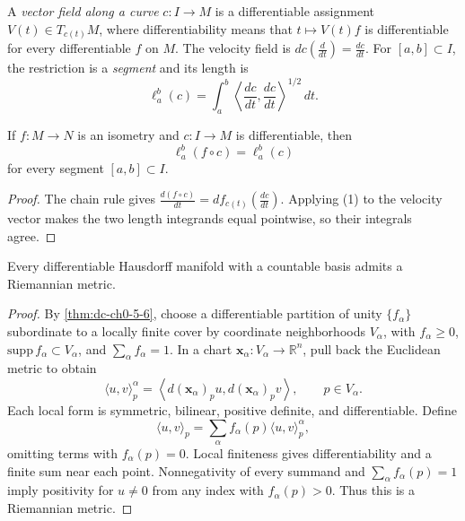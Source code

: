 \begin{definition}
  \label{def:dc-ch1-2-9}
  \leanok
  A \emph{vector field along a curve} $c:I\to M$ is a differentiable assignment
  $V(t)\in T_{c(t)}M$, where differentiability means that $t\mapsto V(t)f$ is
  differentiable for every differentiable $f$ on $M$. The velocity field is
  $dc(\frac{d}{dt})=\frac{dc}{dt}$. For $[a,b]\subset I$, the restriction is a
  \emph{segment} and its length is
  $$
  \ell_a^b(c)=\int_a^b\left\langle\frac{dc}{dt},\frac{dc}{dt}\right\rangle^{1/2}\,dt.
  $$
\end{definition}

\begin{lemma}
  \label{lem:dc-ch1-2-9-isom}
  \leanok
  If $f:M\to N$ is an isometry and $c:I\to M$ is differentiable, then
  $$
  \ell_a^b(f\circ c)=\ell_a^b(c)
  $$
  for every segment $[a,b]\subset I$.
\end{lemma}
\begin{proof}
  \leanok
  \sketch
  The chain rule gives $\frac{d(f\circ c)}{dt}=df_{c(t)}(\frac{dc}{dt})$. Applying
  (1) to the velocity vector makes the two length integrands equal pointwise, so
  their integrals agree.
\end{proof}

\begin{proposition}
  \label{prop:dc-ch1-2-10}
  \leanok
  Every differentiable Hausdorff manifold with a countable basis admits a
  Riemannian metric.
\end{proposition}
\begin{proof}
  \leanok
  \sketch
  By \cref{thm:dc-ch0-5-6}, choose a differentiable partition of unity
  $\{f_\alpha\}$ subordinate to a locally finite cover by coordinate neighborhoods
  $V_\alpha$, with $f_\alpha\ge0$, $\mathrm{supp}\,f_\alpha\subset V_\alpha$,
  and $\sum_\alpha f_\alpha=1$. In a chart
  $\mathbf{x}_\alpha:V_\alpha\to\mathbb{R}^n$, pull back the Euclidean metric to
  obtain
  $$
  \langle u,v\rangle_p^\alpha=
  \left\langle d(\mathbf{x}_\alpha)_p u,d(\mathbf{x}_\alpha)_p v\right\rangle,
  \qquad p\in V_\alpha.
  $$
  Each local form is symmetric, bilinear, positive definite, and differentiable.
  Define
  $$
  \langle u,v\rangle_p=\sum_\alpha f_\alpha(p)\langle u,v\rangle_p^\alpha,
  $$
  omitting terms with $f_\alpha(p)=0$. Local finiteness gives differentiability and
  a finite sum near each point. Nonnegativity of every summand and
  $\sum_\alpha f_\alpha(p)=1$ imply positivity for $u\ne0$ from any index with
  $f_\alpha(p)>0$. Thus this is a Riemannian metric.
\end{proof}

